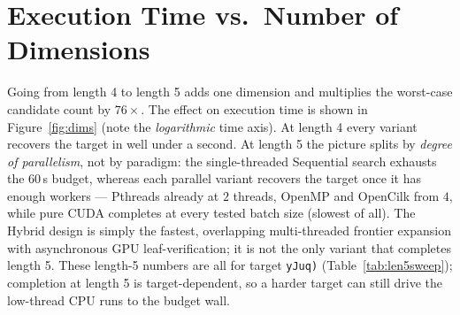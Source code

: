 \documentclass[11pt,a4paper]{article}
\begin{document}
\section{Execution Time vs.\ Number of Dimensions}
Going from length 4 to length 5 adds one dimension and multiplies the worst-case candidate count by
$76\times$. The effect on execution time is shown in Figure~\ref{fig:dims} (note the
\emph{logarithmic} time axis). At length 4 every variant recovers the target in well under a second.
At length 5 the picture splits by \emph{degree of parallelism}, not by paradigm: the single-threaded
Sequential search exhausts the $60$\,s budget, whereas each parallel variant recovers the target once
it has enough workers --- Pthreads already at $2$ threads, OpenMP and OpenCilk from $4$, while pure
CUDA completes at every tested batch size (slowest of all). The Hybrid design is simply the fastest, overlapping
multi-threaded frontier expansion with asynchronous GPU leaf-verification; it is not the only variant
that completes length 5. These length-5 numbers are all for target \texttt{yJuq)}
(Table~\ref{tab:len5sweep}); completion at length 5 is target-dependent, so a harder target can still
drive the low-thread CPU runs to the budget wall.
\end{document}
